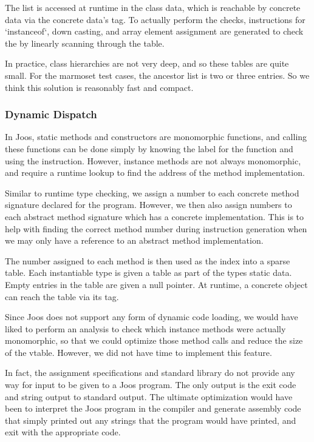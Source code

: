 \documentclass[pdftex,10pt,a4paper]{article}
\begin{document}
The list is accessed at runtime in the class data, which is reachable
by concrete data via the concrete data's tag. To actually perform the
checks, instructions for `instanceof`, down casting, and array element
assignment are generated to check the  by
linearly scanning through the table.

In practice, class hierarchies are not very deep, and so these tables
are quite small. For the marmoset test cases, the ancestor list is two
or three entries. So we think this solution is reasonably fast and
compact.

\subsubsection{Dynamic Dispatch}

In Joos, static methods and constructors are monomorphic functions,
and calling these functions can be done simply by knowing the label
for the function and using the  instruction. However,
instance methods are not always monomorphic, and require a runtime
lookup to find the address of the method implementation.

Similar to runtime type checking, we assign a number to each concrete
method signature declared for the program. However, we then also
assign numbers to each abstract method signature which has a concrete
implementation. This is to help with finding the correct method number
during instruction generation when we may only have a reference to an
abstract method implementation.

The number assigned to each method is then used as the index into a
sparse table. Each instantiable type is given a table as part of the
types static data. Empty entries in the table are given a null
pointer. At runtime, a concrete object can reach the table via its
tag.

Since Joos does not support any form of dynamic code loading, we would
have liked to perform an analysis to check which instance methods were
actually monomorphic, so that we could optimize those method calls and
reduce the size of the vtable. However, we did not have time to
implement this feature.

In fact, the assignment specifications and standard library do not
provide any way for input to be given to a Joos program. The only
output is the exit code and string output to standard output. The
ultimate optimization would have been to interpret the Joos program in
the compiler and generate assembly code that simply printed out any
strings that the program would have printed, and exit with the
appropriate code.
\end{document}
